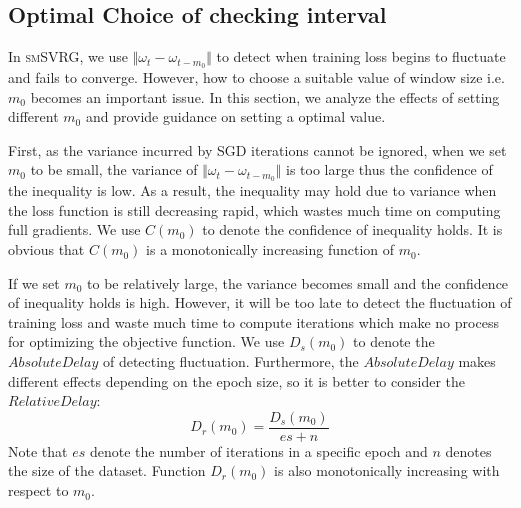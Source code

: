 \documentclass[conference]{IEEEtran}
\begin{document}
 \subsection{Optimal Choice of checking interval}
 \label{m0_analysis}
 In \textsc{smSVRG}, we use $\Vert\omega_{t}-\omega_{t-m_0}\Vert$ to detect when training loss begins to fluctuate and fails to converge. However, how to choose a suitable value of window size i.e. $m_0$ becomes an important issue. In this section, we analyze the effects of setting different $m_0$ and provide guidance on setting a optimal value.
 
 First, as the variance incurred by SGD iterations cannot be ignored, when we set $m_0$ to be small, the variance of $\Vert\omega_{t}-\omega_{t-m_0}\Vert$ is too large thus the confidence of the inequality is low. As a result, the inequality may hold due to variance when the loss function is still decreasing rapid, which wastes much time on computing full gradients. We use $C(m_0)$ to denote the confidence of inequality holds. It is obvious that $C(m_0)$ is a monotonically increasing function of $m_0$.
 
 If we set $m_0$ to be relatively large, the variance becomes small and the confidence of inequality holds is high. However, it will be too late to detect the fluctuation of training loss and waste much time to compute iterations which make no process for optimizing the objective function. We use $D_s(m_0)$ to denote the $Absolute Delay$ of detecting fluctuation. Furthermore, the $Absolute Delay$ makes different effects depending on the epoch size, so it is better to consider the $Relative Delay$:
 $$D_r(m_0)=\frac{D_s(m_0)}{es+n}$$
 Note that $es$ denote the number of iterations in a specific epoch and $n$ denotes the size of the dataset. Function $D_r(m_0)$ is also monotonically increasing with respect to $m_0$.
\end{document}
